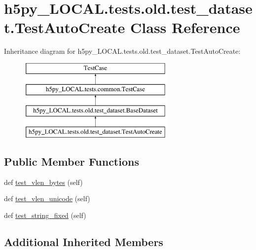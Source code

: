 \hypertarget{classh5py__LOCAL_1_1tests_1_1old_1_1test__dataset_1_1TestAutoCreate}{}\section{h5py\+\_\+\+L\+O\+C\+A\+L.\+tests.\+old.\+test\+\_\+dataset.\+Test\+Auto\+Create Class Reference}
\label{classh5py__LOCAL_1_1tests_1_1old_1_1test__dataset_1_1TestAutoCreate}
Inheritance diagram for h5py\+\_\+\+L\+O\+C\+A\+L.\+tests.\+old.\+test\+\_\+dataset.\+Test\+Auto\+Create\+:\begin{figure}[H]
\begin{center}
\leavevmode
\includegraphics[height=4.000000cm]{classh5py__LOCAL_1_1tests_1_1old_1_1test__dataset_1_1TestAutoCreate}
\end{center}
\end{figure}
\subsection*{Public Member Functions}
\begin{DoxyCompactItemize}
\item 
def \hyperlink{classh5py__LOCAL_1_1tests_1_1old_1_1test__dataset_1_1TestAutoCreate_aedaf679306b4dbbbb9cf4cfb49b63193}{test\+\_\+vlen\+\_\+bytes} (self)
\item 
def \hyperlink{classh5py__LOCAL_1_1tests_1_1old_1_1test__dataset_1_1TestAutoCreate_a32ae28e6c41cb9a83e6acf019afb9b53}{test\+\_\+vlen\+\_\+unicode} (self)
\item 
def \hyperlink{classh5py__LOCAL_1_1tests_1_1old_1_1test__dataset_1_1TestAutoCreate_adeb9bfba627db24428a6af4b50eddd0e}{test\+\_\+string\+\_\+fixed} (self)
\end{DoxyCompactItemize}
\subsection*{Additional Inherited Members}


